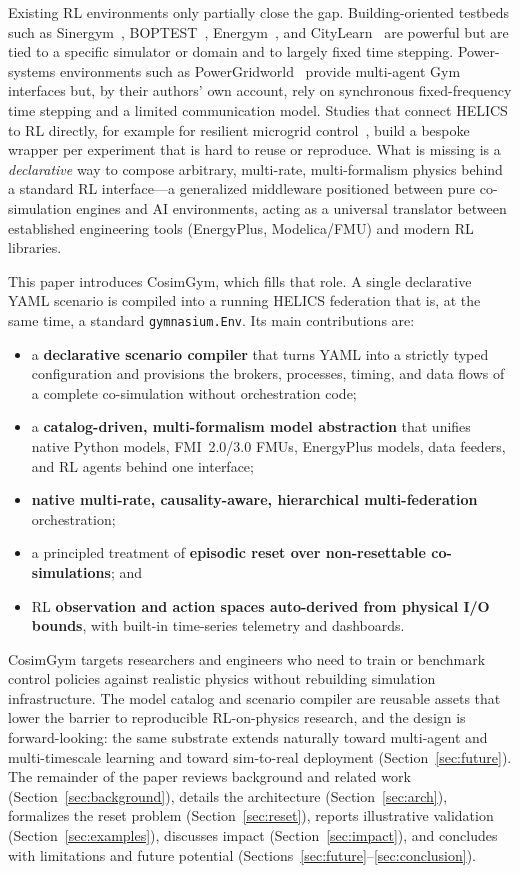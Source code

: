 \documentclass[preprint,12pt]{elsarticle}
\begin{document}
Existing RL environments only partially close the gap. Building-oriented testbeds
such as Sinergym~\cite{sinergym}, BOPTEST~\cite{boptest}, Energym~\cite{energym},
and CityLearn~\cite{citylearn} are powerful but are tied to a specific simulator
or domain and to largely fixed time stepping. Power-systems environments such as
PowerGridworld~\cite{powergridworld} provide multi-agent Gym interfaces but, by
their authors' own account, rely on synchronous fixed-frequency time stepping and
a limited communication model. Studies that connect HELICS to RL directly, for
example for resilient microgrid control~\cite{frl_microgrid}, build a bespoke
wrapper per experiment that is hard to reuse or reproduce. What is missing is a
\emph{declarative} way to compose arbitrary, multi-rate, multi-formalism physics
behind a standard RL interface---a generalized middleware positioned between pure
co-simulation engines and AI environments, acting as a universal translator
between established engineering tools (EnergyPlus, Modelica/FMU) and modern RL
libraries.

This paper introduces CosimGym, which fills that role. A single declarative YAML
scenario is compiled into a running HELICS federation that is, at the same time, a
standard \texttt{gymnasium.Env}. Its main contributions are:
\begin{itemize}
  \item a \textbf{declarative scenario compiler} that turns YAML into a strictly
        typed configuration and provisions the brokers, processes, timing, and
        data flows of a complete co-simulation without orchestration code;
  \item a \textbf{catalog-driven, multi-formalism model abstraction} that unifies
        native Python models, FMI~2.0/3.0 FMUs, EnergyPlus models, data feeders,
        and RL agents behind one interface;
  \item \textbf{native multi-rate, causality-aware, hierarchical
        multi-federation} orchestration;
  \item a principled treatment of \textbf{episodic reset over non-resettable
        co-simulations}; and
  \item RL \textbf{observation and action spaces auto-derived from physical I/O
        bounds}, with built-in time-series telemetry and dashboards.
\end{itemize}

CosimGym targets researchers and engineers who need to train or benchmark control
policies against realistic physics without rebuilding simulation infrastructure.
The model catalog and scenario compiler are reusable assets that lower the barrier
to reproducible RL-on-physics research, and the design is forward-looking: the same
substrate extends naturally toward multi-agent and multi-timescale learning and
toward sim-to-real deployment (Section~\ref{sec:future}). The remainder of the
paper reviews background and related work (Section~\ref{sec:background}), details
the architecture (Section~\ref{sec:arch}), formalizes the reset problem
(Section~\ref{sec:reset}), reports illustrative validation
(Section~\ref{sec:examples}), discusses impact (Section~\ref{sec:impact}), and
concludes with limitations and future potential
(Sections~\ref{sec:future}--\ref{sec:conclusion}).
\end{document}
